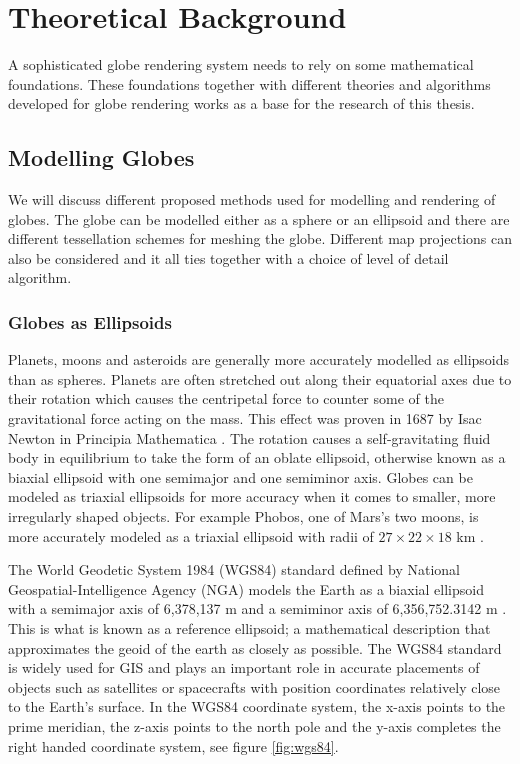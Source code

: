 \chapter{Theoretical Background}

A sophisticated globe rendering system needs to rely on some mathematical foundations. These foundations together with different theories and algorithms developed for globe rendering works as a base for the research of this thesis.

\section{Modelling Globes}

We will discuss different proposed methods used for modelling and rendering of globes. The globe can be modelled either as a sphere or an ellipsoid and there are different tessellation schemes for meshing the globe. Different map projections can also be considered and it all ties together with a choice of level of detail algorithm.

\subsection{Globes as Ellipsoids}

Planets, moons and asteroids are generally more accurately modelled as ellipsoids than as spheres. Planets are often stretched out along their equatorial axes due to their rotation which causes the centripetal force to counter some of the gravitational force acting on the mass. This effect was proven in 1687 by Isac Newton in Principia Mathematica \cite{newton87}. The rotation causes a self-gravitating fluid body in equilibrium to take the form of an oblate ellipsoid, otherwise known as a biaxial ellipsoid with one semimajor and one semiminor axis. Globes can be modeled as triaxial ellipsoids for more accuracy when it comes to smaller, more irregularly shaped objects. For example Phobos, one of Mars's two moons, is more accurately modeled as a triaxial ellipsoid with radii of $27 \times 22 \times 18$ km \cite{cozzi11}.

The World Geodetic System 1984 (WGS84) standard defined by National Geospatial-Intelligence Agency (NGA) models the Earth as a biaxial ellipsoid with a semimajor axis of 6,378,137 m and a semiminor axis of 6,356,752.3142 m \cite{cozzi11}. This is what is known as a reference ellipsoid; a mathematical description that approximates the geoid of the earth as closely as possible. The WGS84 standard is widely used for GIS and plays an important role in accurate placements of objects such as satellites or spacecrafts with position coordinates relatively close to the Earth's surface. In the WGS84 coordinate system, the x-axis points to the prime meridian, the z-axis points to the north pole and the y-axis completes the right handed coordinate system, see figure \ref{fig:wgs84}.


